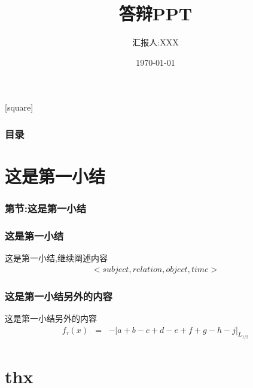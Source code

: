 \documentclass{suesppt}
\begin{document}
    \title[上海工程技术大学硕士学位论文答辩]{答辩PPT}
    \author[汇报人:XXX]{汇报人:XXX}
    \date{\today}
    \begin{frame}
        \titlepage
    \end{frame}
    [square]
    \begin{frame}
        \frametitle{目录}
        \tableofcontents
    \end{frame}

    \section{这是第一小结}
    \begin{frame}
      \frametitle{第\thesection 节:这是第一小结}
      \tableofcontents[currentsection]
    \end{frame}

    \begin{frame}
    \frametitle{这是第一小结}
    
    \hspace{2em}这是第一小结,继续阐述内容
    \begin{eqnarray}
        < subject,relation,object,time>\nonumber
    \end{eqnarray}
    \end{frame}


    \begin{frame}
        \frametitle{这是第一小结另外的内容}
        \hspace{2em}这是第一小结另外的内容
        \begin{eqnarray}
            f_{\tau}\left(x\right)&=&-\left|a+b-c+d-e+f+g-h-j\right|_{L_{1/2}}
        \end{eqnarray}
    \end{frame}

    \section*{thx}
        \begin{frame}
            \begin{center}
                \fontsize{60pt}{\baselineskip}\selectfont {}
            \end{center}
            
            \nocite{*} 
            
        \end{frame}
\end{document}
